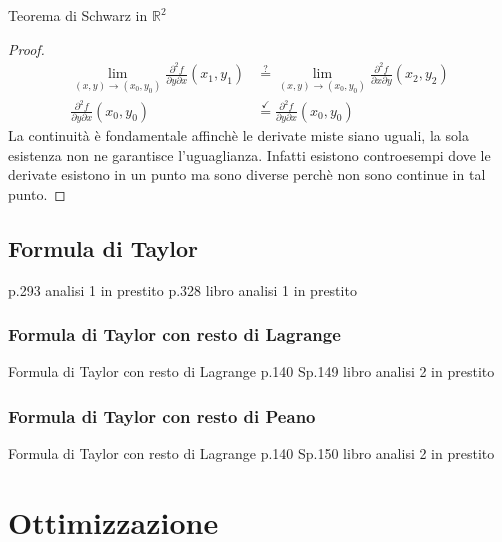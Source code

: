 \documentclass{article}  %
\begin{document}
\begin{theorem}{Teorema di Schwarz in $\mathbb{R}^2$}
\begin{proof}
\begin{align*}
			\lim_{(x,y) \to (x_0,y_0)} \frac{\partial^2 f}{\partial y \partial x}(x_1,y_1) & \overset{?}{=} \lim_{(x,y) \to (x_0,y_0)} \frac{\partial^2f}{\partial x \partial y}(x_2,y_2)             \\
			\frac{\partial^2 f}{\partial y \partial x}(x_0,y_0)                            & \overset{\checkmark}{=} \frac{\partial^2 f}{\partial y \partial x}(x_0,y_0)
		\end{align*}
		La continuità è fondamentale affinchè le derivate miste siano uguali, la sola esistenza non ne garantisce l'uguaglianza. Infatti esistono controesempi dove le derivate
		esistono in un punto ma sono diverse perchè non sono continue in tal punto.
	\end{proof}
\end{theorem}

\subsection{Formula di Taylor}
p.293 analisi 1 in prestito
p.328 libro analisi 1 in prestito
\subsubsection{Formula di Taylor con resto di Lagrange}

\begin{theorem}{Formula di Taylor con resto di Lagrange p.140}
	Sp.149 libro analisi 2 in prestito
\end{theorem}
\subsubsection{Formula di Taylor con resto di Peano}
\begin{theorem}{Formula di Taylor con resto di Lagrange p.140}
	Sp.150 libro analisi 2 in prestito
\end{theorem}

\section{Ottimizzazione}
\end{document}
